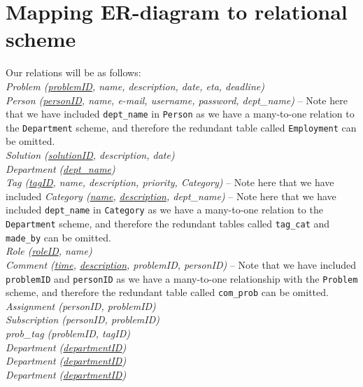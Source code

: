 \section{Mapping ER-diagram to relational scheme}
\label{sec:map_er_rel}

Our relations will be as follows:\\

\noindent \textit{Problem (\underline{problemID}, name, description, date, eta, deadline)} \\
\textit{Person (\underline{personID}, name, e-mail, username, password, dept_name)}  -- Note here that we have included \verb+dept_name+ in \verb+Person+ as we have a many-to-one relation to the \verb+Department+ scheme, and therefore the redundant table called \verb+Employment+ can be omitted.\\
\textit{Solution (\underline{solutionID}, description, date)} \\
\textit{Department (\underline{dept\_name})} \\
\textit{Tag (\underline{tagID}, name, description, priority, Category)} -- Note here that we have included \verb++
\textit{Category (\underline{name}, \underline{description}, dept\_name)} -- Note here that we have included \verb+dept_name+ in \verb+Category+ as we have a many-to-one relation to the \verb+Department+ scheme, and therefore the redundant tables called \verb+tag_cat+ and \verb+made_by+ can be omitted.\\
\textit{Role (\underline{roleID}, name)} \\
\textit{Comment (\underline{time}, \underline{description}, problemID, personID)} -- Note that we have included \verb+problemID+ and \verb+personID+ as we have a many-to-one relationship with the \verb+Problem+ scheme, and therefore the redundant table called \verb+com_prob+ can be omitted.\\
\textit{Assignment (personID, problemID)} \\
\textit{Subscription (personID, problemID)} \\
\textit{prob_tag (problemID, tagID)} \\
\textit{Department (\underline{departmentID})} \\
\textit{Department (\underline{departmentID})} \\
\textit{Department (\underline{departmentID})} \\